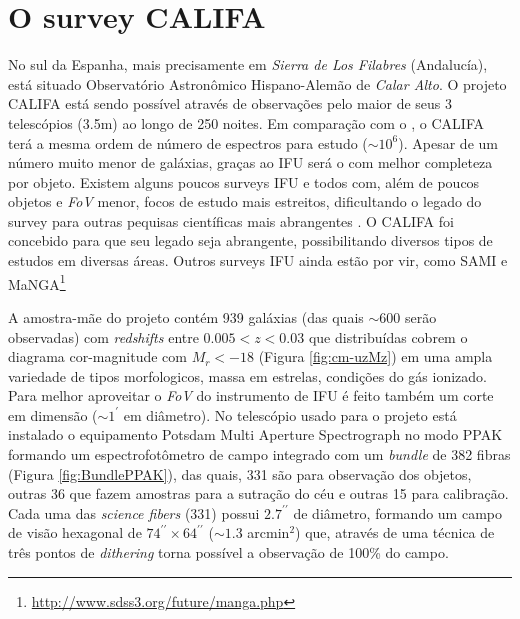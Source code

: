 
\section{O survey CALIFA}
\label{sec:CALePyC:Apresent}

No sul da Espanha, mais precisamente em {\em Sierra de Los Filabres} (Andalucía), está situado Observatório Astronômico
Hispano-Alemão de {\em Calar Alto}. O projeto CALIFA está sendo possível através de observações pelo maior de seus 3
telescópios (3.5m) ao longo de 250 noites. Em comparação com o \SDSS, o CALIFA terá a mesma ordem de número de espectros
para estudo ($\sim 10^6$). Apesar de um número muito menor de galáxias, graças ao IFU será o com melhor completeza por
objeto. Existem alguns poucos surveys IFU e todos com, além de poucos objetos e {\em FoV} menor, focos de estudo mais
estreitos, dificultando o legado do survey para outras pequisas científicas mais abrangentes \citep[SAURON;][região
central de 72 galáxias com $z < 0.01$.]{de-Zeeuw2002} \citep[PINGS;][algumas galáxias muito próximas ($\sim 10$ Mpc) e o
estudo atual de 70 (U)LIRGs com $z <0.26$]{RosalesOrtega2010} \citep[VENGA;][$30$ galáxias espirais]{Blanc2010}
\citep[ATLAS\textsuperscript{3D};][260 galáxias {\em early-type} próximas]{Cappellari2011}. O CALIFA foi concebido para
que seu legado seja abrangente, possibilitando diversos tipos de estudos em diversas áreas. Outros surveys IFU ainda estão por vir,
como SAMI \citep{Croom2012} e MaNGA\footnote{\url{http://www.sdss3.org/future/manga.php}}

A amostra-mãe do projeto contém 939 galáxias (das quais $\sim 600$ serão observadas) com {\em redshifts} entre $0.005 <
z < 0.03$ que distribuídas cobrem o diagrama cor-magnitude com $M_r < -18$ (Figura \ref{fig:cm-uzMz}) em uma ampla
variedade de tipos morfologicos, massa em estrelas, condições do gás ionizado. Para melhor aproveitar o {\em FoV} do
instrumento de IFU é feito também um corte em dimensão ($\sim1^{\prime}$ em diâmetro). No telescópio usado para o
projeto está instalado o equipamento Potsdam Multi Aperture Spectrograph \citep[PMAS; ][]{Roth2005} no modo PPAK
\citep{Verheijen2004, Kelz2006} formando um espectrofotômetro de campo integrado com um {\em bundle} de 382 fibras
(Figura \ref{fig:BundlePPAK}), das quais, 331 são para observação dos objetos, outras 36 que fazem amostras para a
sutração do céu e outras 15 para calibração. Cada uma das {\em science fibers} (331) possui $2.7^{\prime\prime}$ de
diâmetro, formando um campo de visão hexagonal de $74^{\prime\prime} \times 64^{\prime\prime}$ ($\sim1.3$ arcmin$^2$)
que, através de uma técnica de três pontos de {\em dithering} torna possível a observação de 100\% do campo.

